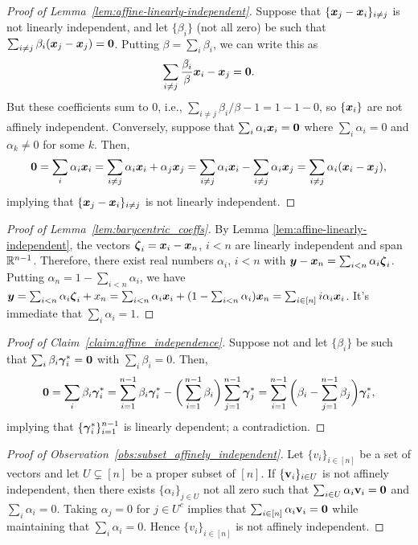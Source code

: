 \begin{proof}[Proof of Lemma~\ref{lem:affine-linearly-independent}]
	Suppose that $\{\vb*{x}_j-\vb*{x}_i\}_{i\neq j}$ is not linearly independent, and let $\{\beta_i\}$ (not all zero) be such that $\sum_{i\neq j}\beta_i (\vb*{x}_j-\vb*{x}_j)=\vb{0}$. Putting $\beta=\sum_i \beta_i$, we can write this as 
	\[\sum_{i\neq j}\frac{\beta_i}{\beta}\vb*{x}_i - \vb*{x}_j=\vb{0}.\]
	But these coefficients sum to 0, i.e., $\sum_{i\neq j}\beta_i/\beta -1=1-1-0$, so $\{\vb*{x}_i\}$ are not affinely independent. Conversely, suppose that $\sum_i\alpha_i\vb*{x}_i=\vb{0}$ where $\sum_i\alpha_i=0$ and $\alpha_k\neq 0$ for some $k$. Then, 
	\[\vb{0} =\sum_i\alpha_i\vb*{x}_i = \sum_{i\neq j}\alpha_i\vb*{x}_i + \alpha_j\vb*{x}_j = \sum_{i\neq j}\alpha_i\vb*{x}_i - \sum_{i\neq j}\alpha_i\vb*{x}_j = \sum_{i\neq j}\alpha_i(\vb*{x}_i-\vb*{x}_j), \]
	implying that $\{\vb*{x}_j-\vb*{x}_i\}_{i\neq j}$ is not linearly independent. 
\end{proof}

\begin{proof}[Proof of Lemma~\ref{lem:barycentric_coeffs}]
	By Lemma \ref{lem:affine-linearly-independent}, the vectors $\vb*{\zeta}_i=\vb*{x}_i-\vb*{x}_n$, $i<n$ are linearly independent and span $\mathbb{R}^{n-1}$. Therefore, there exist real numbers $\alpha_i$, $i<n$ with $\vb*{y}-\vb*{x}_n = \sum_{i<n} \alpha_i\vb*{\zeta}_i$. Putting $\alpha_n=1-\sum_{i<n}\alpha_i$, we have $\vb*{y}=\sum_{i<n}\alpha_i\vb*{\zeta}_i + x_n = \sum_{i<n} \alpha_i\vb*{x}_i + (1-\sum_{i<n}\alpha_i)\vb*{x}_n = \sum_{i\in[n]}i \alpha_i\vb*{x}_i$. It's immediate that $\sum_i\alpha_i=1$. 
\end{proof}

\begin{proof}[Proof of Claim~\ref{claim:affine_independence}]
	Suppose not and let $\{\beta_i\}$ be such that $\sum_i \beta_i \vb*{\gamma}^*_i =\vb{0}$ with $\sum_i\beta_i=0$. Then, 
	\[\vb{0} = \sum_i\beta_i\vb*{\gamma}^*_i = \sum_{i=1}^{n-1} \beta_i \vb*{\gamma}^*_i - \bigg(\sum_{i=1}^{n-1} \beta_i\bigg)\sum_{j=1}^{n-1}\vb*{\gamma}^*_j = \sum_{i=1}^{n-1}\bigg(\beta_i-\sum_{j=1}^{n-1}\beta_j\bigg)\vb*{\gamma}^*_i,\]
	implying that $\{\vb*{\gamma}^*_i\}_{i=1}^{n-1}$ is linearly dependent; a contradiction.  
\end{proof}

\begin{proof}[Proof of Observation~\ref{obs:subset_affinely_independent}]
	Let $\{v_i\}_{i\in[n]}$ be a set of vectors and let $U\subsetneq[n]$ be a proper subset of $[n]$. If $\{\vb{v}_i\}_{i\in U}$ is not affinely independent, then there exists $\{\alpha_i\}_{j\in U}$ not all zero such that $\sum_{i\in U}\alpha_i\vb{v}_i=\vb{0}$ and $\sum_i\alpha_i=0$. Taking $\alpha_j=0$ for $j\in U^c$ implies that $\sum_{i\in[n]}\alpha_i\vb{v}_i=\vb{0}$ while maintaining that $\sum_{i}\alpha_i=0$. Hence $\{v_i\}_{i\in[n]}$ is not affinely independent. 
\end{proof}

